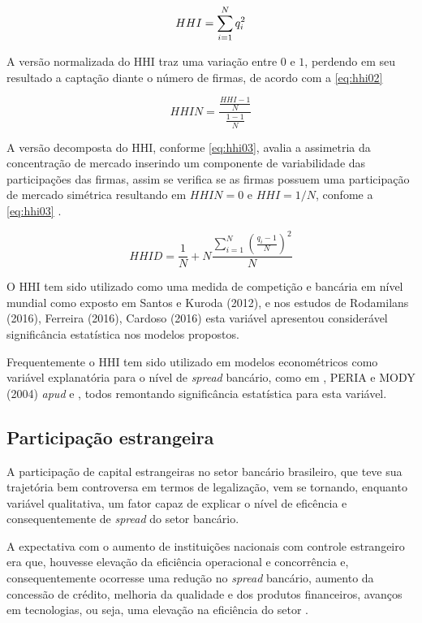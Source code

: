 \documentclass[
  12pt,
  12pt,
  openright,
  oneside,
  a4paper,
  chapter=TITLE,
  section=TITLE,
  subsection=TITLE,
  subsubsection=TITLE,
  portugues,
  sumario=tradicional]{abntex2}
\begin{document}
\begin{equation}\label{eq:hhi01}
HHI = \sum_{i=1}^{N}q_i^2
\vspace{10pt}
\end{equation}

A versão normalizada do HHI traz uma variação entre \(0\) e \(1\), perdendo em seu resultado a captação diante o número de firmas, de acordo com a \autoref{eq:hhi02}

\begin{equation}\label{eq:hhi02}
HHIN = \frac{\frac{HHI - 1}{N}}{\frac{1-1}{N}}
\end{equation}

A versão decomposta do HHI, conforme \autoref{eq:hhi03}, avalia a assimetria da concentração de mercado inserindo um componente de variabilidade das participações das firmas, assim se verifica se as firmas possuem uma participação de mercado simétrica resultando em \(HHIN = 0\) e \(HHI= 1/N\), confome a \autoref{eq:hhi03}
.

\begin{equation}\label{eq:hhi03}
HHID = \frac{1}{N} + N\frac{\sum_{i=1}^{N}(\frac{q_i - 1}{N})^2}{N}
\end{equation}

O HHI tem sido utilizado como uma medida de competição e bancária em nível mundial como exposto em Santos e Kuroda (2012), e nos estudos de Rodamilans (2016), Ferreira (2016), Cardoso (2016) esta variável apresentou considerável significância estatística nos modelos propostos.

Frequentemente o HHI tem sido utilizado em modelos econométricos como variável explanatória para o nível de \emph{spread} bancário, como em \textcite{dantas:2012}, PERIA e MODY (2004) \emph{apud} \textcite{leal:2006} e \textcite{almeida:2013}, todos remontando significância estatística para esta variável.

\subsection{Participação estrangeira}

A participação de capital estrangeiras no setor bancário brasileiro, que teve sua trajetória bem controversa em termos de legalização, vem se tornando, enquanto variável qualitativa, um fator capaz de explicar o nível de eficência e consequentemente de \emph{spread} do setor bancário.

A expectativa com o aumento de instituições nacionais com controle estrangeiro era que, houvesse elevação da eficiência operacional e concorrência e, consequentemente ocorresse uma redução no \emph{spread} bancário, aumento da concessão de crédito, melhoria da qualidade e dos produtos financeiros, avanços em tecnologias, ou seja, uma elevação na eficiência do setor \cite{camargo:2009}.
\end{document}
